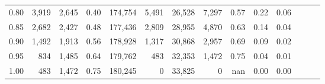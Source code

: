 \begin{tabular}{rrrrrrrrrrrrrr}
0.80 &   3,919 &  2,645 &  0.40 &  174,754 &    5,491 &  26,528 &   7,297 &  0.57 &  0.22 &      0.06 \\
0.85 &   2,682 &  2,427 &  0.48 &  177,436 &    2,809 &  28,955 &   4,870 &  0.63 &  0.14 &      0.04 \\
0.90 &   1,492 &  1,913 &  0.56 &  178,928 &    1,317 &  30,868 &   2,957 &  0.69 &  0.09 &      0.02 \\
0.95 &     834 &  1,485 &  0.64 &  179,762 &      483 &  32,353 &   1,472 &  0.75 &  0.04 &      0.01 \\
1.00 &     483 &  1,472 &  0.75 &  180,245 &        0 &  33,825 &       0 &   nan &  0.00 &      0.00 \\
\bottomrule
\end{tabular}

